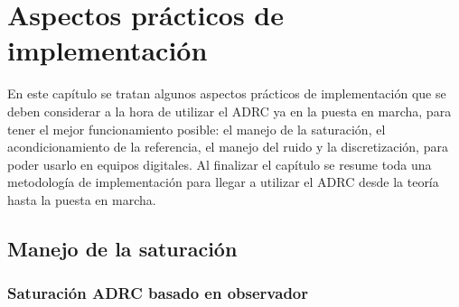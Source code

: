 \chapter{Aspectos prácticos de implementación}
\label{cap:implementacion}
En este capítulo se tratan algunos aspectos prácticos de implementación que se deben
considerar a la hora de utilizar el ADRC ya en la puesta en marcha, para tener el mejor
funcionamiento posible: el manejo de la saturación, el acondicionamiento de la referencia,
el manejo del ruido y la discretización, para poder usarlo en equipos digitales. Al
finalizar el capítulo se resume toda una metodología de implementación para llegar a
utilizar el ADRC desde la teoría hasta la puesta en marcha.

\section{Manejo de la saturación}
\label{sec:impl_saturacion}

\subsection{Saturación ADRC basado en observador}
\label{subsec:sat_adrc}

